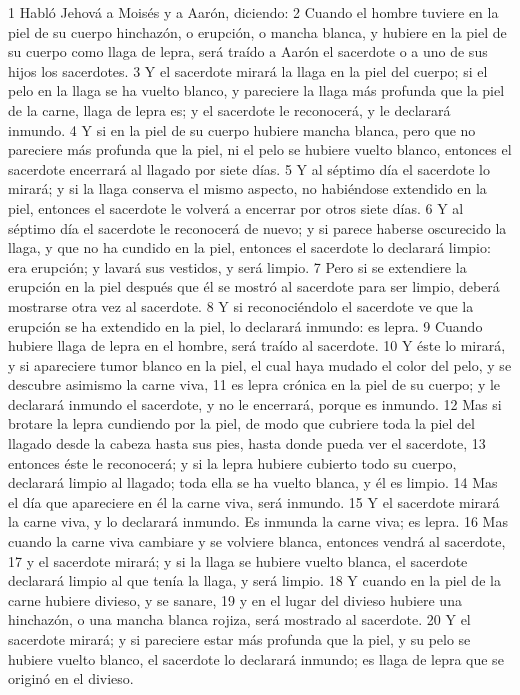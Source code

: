 1 Habló Jehová a Moisés y a Aarón, diciendo:
2 Cuando el hombre tuviere en la piel de su cuerpo hinchazón, o erupción, o mancha blanca, y hubiere en la piel de su cuerpo como llaga de lepra, será traído a Aarón el sacerdote o a uno de sus hijos los sacerdotes.
3 Y el sacerdote mirará la llaga en la piel del cuerpo; si el pelo en la llaga se ha vuelto blanco, y pareciere la llaga más profunda que la piel de la carne, llaga de lepra es; y el sacerdote le reconocerá, y le declarará inmundo.
4 Y si en la piel de su cuerpo hubiere mancha blanca, pero que no pareciere más profunda que la piel, ni el pelo se hubiere vuelto blanco, entonces el sacerdote encerrará al llagado por siete días.
5 Y al séptimo día el sacerdote lo mirará; y si la llaga conserva el mismo aspecto, no habiéndose extendido en la piel, entonces el sacerdote le volverá a encerrar por otros siete días.
6 Y al séptimo día el sacerdote le reconocerá de nuevo; y si parece haberse oscurecido la llaga, y que no ha cundido en la piel, entonces el sacerdote lo declarará limpio: era erupción; y lavará sus vestidos, y será limpio.
7 Pero si se extendiere la erupción en la piel después que él se mostró al sacerdote para ser limpio, deberá mostrarse otra vez al sacerdote.
8 Y si reconociéndolo el sacerdote ve que la erupción se ha extendido en la piel, lo declarará inmundo: es lepra.
9 Cuando hubiere llaga de lepra en el hombre, será traído al sacerdote.
10 Y éste lo mirará, y si apareciere tumor blanco en la piel, el cual haya mudado el color del pelo, y se descubre asimismo la carne viva,
11 es lepra crónica en la piel de su cuerpo; y le declarará inmundo el sacerdote, y no le encerrará, porque es inmundo.
12 Mas si brotare la lepra cundiendo por la piel, de modo que cubriere toda la piel del llagado desde la cabeza hasta sus pies, hasta donde pueda ver el sacerdote,
13 entonces éste le reconocerá; y si la lepra hubiere cubierto todo su cuerpo, declarará limpio al llagado; toda ella se ha vuelto blanca, y él es limpio.
14 Mas el día que apareciere en él la carne viva, será inmundo.
15 Y el sacerdote mirará la carne viva, y lo declarará inmundo. Es inmunda la carne viva; es lepra.
16 Mas cuando la carne viva cambiare y se volviere blanca, entonces vendrá al sacerdote,
17 y el sacerdote mirará; y si la llaga se hubiere vuelto blanca, el sacerdote declarará limpio al que tenía la llaga, y será limpio.
18 Y cuando en la piel de la carne hubiere divieso, y se sanare,
19 y en el lugar del divieso hubiere una hinchazón, o una mancha blanca rojiza, será mostrado al sacerdote.
20 Y el sacerdote mirará; y si pareciere estar más profunda que la piel, y su pelo se hubiere vuelto blanco, el sacerdote lo declarará inmundo; es llaga de lepra que se originó en el divieso.
